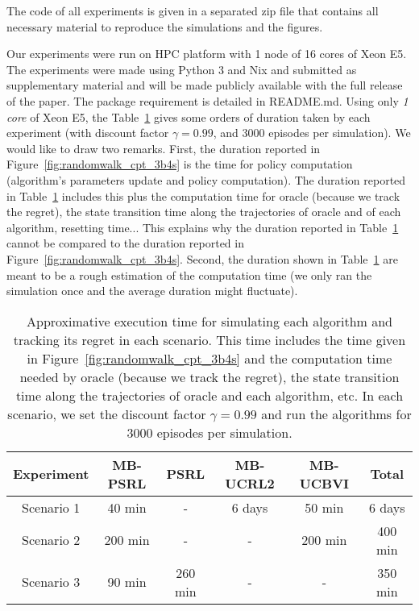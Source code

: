 \begin{subappendices}
The code of all experiments is given in a separated zip file that contains all necessary material to reproduce the simulations and the figures. 

Our experiments were run on HPC platform with 1 node of 16 cores of Xeon E5. The experiments were made using Python 3 and Nix and submitted as supplementary material and will be made publicly available with the full release of the paper. The package requirement is detailed in README.md. Using only \emph{1 core} of Xeon E5, the Table~\ref{tab:sim_time} gives some orders of duration taken by each experiment (with discount factor $\gamma=0.99$, and 3000 episodes per simulation). We would like to draw two remarks. First, the duration reported in Figure~\ref{fig:randomwalk_cpt_3b4s} is the time for policy computation (algorithm's parameters update and policy computation). The duration reported in Table~\ref{tab:sim_time} includes this plus the computation time for oracle (because we track the regret), the state transition time along the trajectories of oracle and of each algorithm, resetting time... This explains why the duration reported in Table~\ref{tab:sim_time} cannot be compared to the duration reported in Figure~\ref{fig:randomwalk_cpt_3b4s}.  Second, the duration shown in Table~\ref{tab:sim_time} are meant to be a rough estimation of the computation time (we only ran the simulation once and the average duration might fluctuate). 

\begin{table}[ht]
    \centering
    \begin{tabular}{ |c|c|c|c|c|c| } 
    \hline
    Experiment & MB-PSRL  & PSRL & MB-UCRL2 & MB-UCBVI & Total\\
    \hline
    Scenario 1 & 40 min  & - & 6 days & 50 min & 6 days\\ 
    \hline
    Scenario 2 & 200 min  & - & - & 200 min & 400 min\\ 
    \hline
    Scenario 3 & 90 min  & 260 min & - & - & 350 min\\ 
    \hline
    \end{tabular}
\vspace{0.2cm}
\caption{Approximative execution time for simulating each algorithm and tracking its regret in each scenario. This time includes the time given in Figure~\ref{fig:randomwalk_cpt_3b4s} and the computation time needed by oracle (because we track the regret), the state transition time along the trajectories of oracle and each algorithm, etc. In each scenario, we set the discount factor $\gamma=0.99$ and run the algorithms for $3000$ episodes per simulation.}
\label{tab:sim_time}
\end{table}

\end{subappendices}

\endgroup
